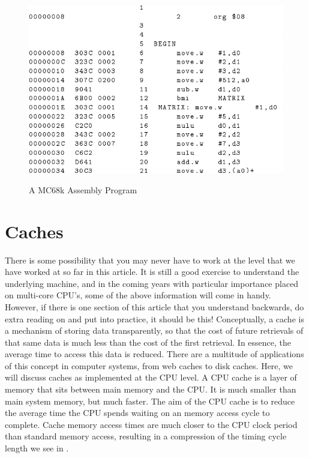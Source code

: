 \documentclass[10pt,a4paper]{article}
\begin{document}
\begin{figure}
\caption{A MC68k Assembly Program \cite{LYNCH-68K}}
\begin{center}
\includegraphics[scale=0.40]{../images/assembly-program.png}
\label{program}
\end{center}
\end{figure}

\section{Caches}
There is some possibility that you may never have to work at the level that we have worked at so far in this article. It is still a good exercise to understand the underlying machine, and in the coming years with particular importance placed on multi-core CPU's, some of the above information will come in handy. However, if there is one section of this article that you understand backwards, do extra reading on and put into practice, it should be this!
\newline\newline 
Conceptually, a cache is a mechanism of storing data transparently, so that the cost of future retrievals of that same data is much less than the cost of the first retrieval. In essence, the average time to access this data is reduced. There are a multitude of applications of this concept in computer systems, from web caches to disk caches. Here, we will discuss caches as implemented at the CPU level. 
\newline\newline
A CPU cache is a layer of memory that sits between main memory and the CPU. It is much smaller than main system memory, but much faster. The aim of the CPU cache is to reduce the average time the CPU spends waiting on an memory access cycle to complete. Cache memory access times are much closer to the CPU clock period than standard memory access, resulting in a compression of the timing cycle length we see in \label{read-write}.
\end{document}
